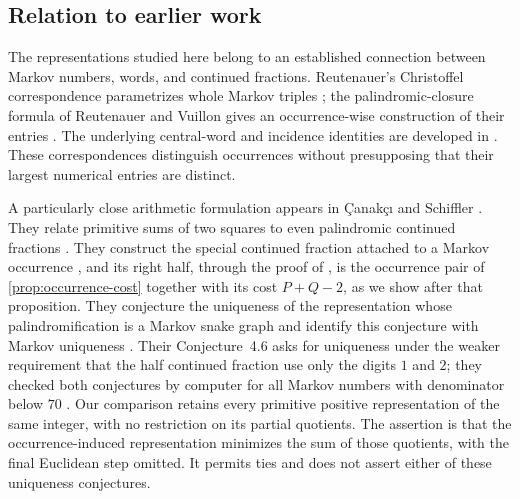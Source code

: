 \subsection{Relation to earlier work}

The representations studied here belong to an established connection
between Markov numbers, words, and continued fractions. Reutenauer's
Christoffel correspondence parametrizes whole Markov triples
\cite{Reutenauer2009}; the palindromic-closure formula of Reutenauer and
Vuillon gives an occurrence-wise construction of their entries
\cite{ReutenauerVuillon2017}. The underlying central-word and incidence
identities are developed in \cite{BertheDeLucaReutenauer2008}.
These correspondences distinguish occurrences without presupposing that
their largest numerical entries are distinct.

A particularly close arithmetic formulation appears in
\c{C}anak\c{c}{\i} and Schiffler \cite{CanakciSchiffler2020}.
They relate primitive sums of two squares to even palindromic continued
fractions \cite[Theorem~3.10 and Corollary~3.14]{CanakciSchiffler2020}. They
construct the special continued fraction attached to a Markov occurrence
\cite[Theorem~4.1]{CanakciSchiffler2020}, and its right half, through the
proof of \cite[Corollary~4.4]{CanakciSchiffler2020}, is the occurrence pair of
\cref{prop:occurrence-cost} together with its cost $P+Q-2$, as we show after
that proposition.
They conjecture the uniqueness of the representation whose
palindromification is a Markov snake graph
\cite[Conjecture~4.5]{CanakciSchiffler2020} and identify this conjecture
with Markov uniqueness \cite[Theorem~4.8]{CanakciSchiffler2020}. Their
Conjecture~4.6 asks for uniqueness
under the weaker requirement that the half continued fraction use only
the digits $1$ and $2$; they checked both conjectures by computer for all
Markov numbers with denominator below $70$ \cite[Remark~4.7]{CanakciSchiffler2020}.
Our comparison retains every primitive positive representation of the
same integer, with no restriction on its partial quotients. The assertion
is that the occurrence-induced representation minimizes the sum of those
quotients, with the final Euclidean step omitted. It permits ties and
does not assert either of these uniqueness conjectures.

